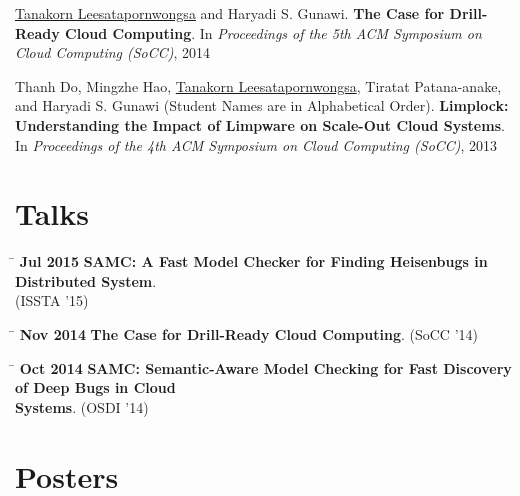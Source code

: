 \documentclass[10pt]{article} %
\begin{document}
\underline{Tanakorn Leesatapornwongsa} and Haryadi S. Gunawi. \textbf{The Case
for Drill-Ready Cloud Computing}. In \textit{Proceedings of the 5th ACM
Symposium on Cloud Computing (SoCC)}, 2014
\vspace{2mm}

Thanh Do, Mingzhe Hao, \underline{Tanakorn Leesatapornwongsa}, Tiratat
Patana-anake, and Haryadi S. Gunawi (Student Names are in Alphabetical Order).
\textbf{Limplock: Understanding the Impact of Limpware on Scale-Out Cloud
Systems}. In \textit{Proceedings of the 4th ACM Symposium on Cloud Computing
(SoCC)}, 2013


\section{Talks}

\begin{tabbing}
\hspace{2.5cm} \= \kill
\textbf{Jul 2015} \> \textbf{SAMC: A Fast Model Checker for Finding Heisenbugs in Distributed System}. \\
\> (ISSTA '15)
\end{tabbing}

\begin{tabbing}
\hspace{2.5cm} \= \kill
\textbf{Nov 2014} \> \textbf{The Case for Drill-Ready Cloud Computing}. (SoCC '14)
\end{tabbing}

\begin{tabbing}
\hspace{2.5cm} \= \kill
\textbf{Oct 2014} \> \textbf{SAMC: Semantic-Aware Model Checking for Fast Discovery of Deep Bugs in 
Cloud} \\
\> \textbf{Systems}. (OSDI '14)
\end{tabbing}


\section{Posters}
\end{document}
